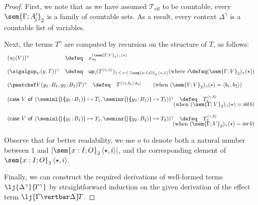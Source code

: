 \begin{proof}
First, we note that as we have assumed $\mathcal{T}_{\text{eff}}$ to be countable, every $\sem{\Gamma; A'_{\!j}}_{2}$ is a family of countable sets. As a result, every context $\Delta^\gamma$ is a countable list of variables.

Next, the terms $T^\gamma$ are computed by recursion on the structure of $T$, as follows: 
\[
\begin{array}{l c l}
(w_{\!j}(V))^\gamma & \defeq & x_{w_{\!j}}^{(\sem{\Gamma;V}_{2})_\gamma(\star)}
\\[4mm]
(\sigalgop_V(y.\, T))^\gamma & \defeq & \mathsf{op}_{i}(T^{\langle \gamma , o \rangle})_{1 \,\leq\, o \,\leq\, \vert \sem{x : I; O}_{2}\, \langle \star , i \rangle \vert} \hfill (\text{where } i \defeq (\sem{\Gamma;V}_{2})_\gamma(\star))
\\[4mm]
\multicolumn{3}{l}{(\pmatchsf V {(y_1 \!:\! B_1, y_2 \!:\! B_2)} {} T)^{\gamma} \,\,\,\,\,\, \defeq \,\,\,\,\,\, T^{\langle \langle \gamma , b_1 \rangle , b_2 \rangle} \qquad (\text{when } (\sem{\Gamma;V}_2)_\gamma(\star) = \langle b_1 , b_2 \rangle)}
\\[4mm]
\multicolumn{3}{l}{(\mathsf{case~} V \mathsf{~of}_{} \mathsf{~} ({\seminl {\!} {\!\!(y_1 \!:\! B_1)} \mapsto T_1}, {\seminr {\!} {\!\!(y_2 \!:\! B_2)} \mapsto T_2}))^{\gamma} \,\,\,\,\,\, \defeq \,\,\,\,\,\, T_1^{\langle \gamma , b \rangle}}
\\[-1mm]
&& \hfill (\text{when } (\sem{\Gamma;V}_2)_\gamma(\star) = \mathsf{inl}\, b)
\\[4mm]
\multicolumn{3}{l}{(\mathsf{case~} V \mathsf{~of}_{} \mathsf{~} ({\seminl {\!} {\!\!(y_1 \!:\! B_1)} \mapsto T_1}, {\seminr {\!} {\!\!(y_2 \!:\! B_2)} \mapsto T_2}))^{\gamma} \,\,\,\,\,\, \defeq \,\,\,\,\,\, T_2^{\langle \gamma , b \rangle}}
\\[-1mm]
&& \hfill (\text{when } (\sem{\Gamma;V}_2)_\gamma(\star) = \mathsf{inr}\, b)
\end{array}
\]

Observe that for better readability, we use $o$ to denote both a natural number between $1$ and $\vert \sem{x : I; O}_{2}\, \langle \star , i \rangle \vert$, and the corresponding element of $\sem{x : I; O}_{2}\, \langle \star , i \rangle$.

Finally, we can construct the required derivations of well-formed terms $\lj {\Delta^\gamma} {\!T^\gamma}$ \linebreak by straightforward induction on the given derivation of the effect term $\lj {\Gamma \vertbar \Delta} \!T$.
\end{proof}

